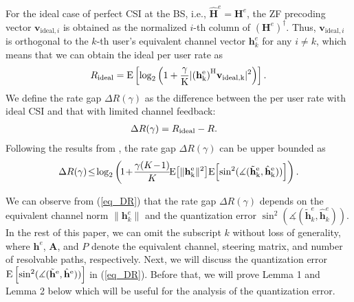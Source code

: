 \documentclass[10pt,twocolumn,twoside]{IEEEtran}
\begin{document}
For the ideal case of perfect CSI at the BS, i.e., $\mathbf{\hat{H}}^e=\mathbf{H}^e$,
the ZF precoding vector $\mathbf{v}_{\text{ideal},i}$ is obtained as the normalized $i$-th column of ${(\mathbf{H}^e)}^\dagger$.
Thus, $\mathbf{v}_{\text{ideal},i}$ is orthogonal to the $k$-th user's equivalent channel vector $\mathbf{h}_k^e$ for any $i\neq k$,
which means that we can obtain the ideal per user rate as
 \begin{align}
R_\text{ideal}=\rm{E}\left[ \log_2\left( 1+\frac{\gamma}{K}|{(\mathbf{h}_k^e)}^{\rm{H}}\mathbf{v}_{\text{ideal},k}|^2\right) \right] .
\end{align}
We define the rate gap $\Delta R(\gamma)$ as the difference between the per user rate with ideal CSI and that with limited channel feedback:
\begin{align}
 \vspace{-1mm}
\Delta R(\gamma) &= R_\text{ideal}-R.
 \vspace{-1mm}
\end{align}
Following the results from \cite{TIT_NJindal_MIMOBroadcast}, the rate gap $\Delta R(\gamma)$ can be upper bounded as
\begin{align}\label{eq_DR}
\Delta R(\gamma)\!\leq\! \log_2\left(\!1\!+\!\frac{\gamma(K\!-\!1)}{K}\!\rm{E}\!\left[ \|\mathbf{h}_k^e\|^2\right]\!\rm{E}\!\left[ \sin^2(\measuredangle(\tilde{\mathbf{h}}_k^e,\hat{\mathbf{h}}_k^e))\right] \right) .
\end{align}

We can observe from (\ref{eq_DR}) that the rate gap $\Delta R(\gamma)$ depends on the equivalent channel norm $\|\mathbf{h}_k^e\|$ and the quantization error $\sin^2(\measuredangle(\tilde{\mathbf{h}}_k^e,\hat{\mathbf{h}}_k^e))$. In the rest of this paper, we can omit the subscript $k$ without loss of generality, where $\mathbf{h}^e$, $\mathbf{A}$, and $P$ denote the equivalent channel, steering matrix, and number of resolvable paths, respectively. 
Next, we will discuss the quantization error $\rm{E}\left[ \sin^2(\measuredangle(\tilde{\mathbf{h}}^e,\hat{\mathbf{h}}^e))\right]$ in (\ref{eq_DR}).
Before that, we will prove Lemma 1 and Lemma 2 below which will be useful for the analysis of the quantization error.
\end{document}
